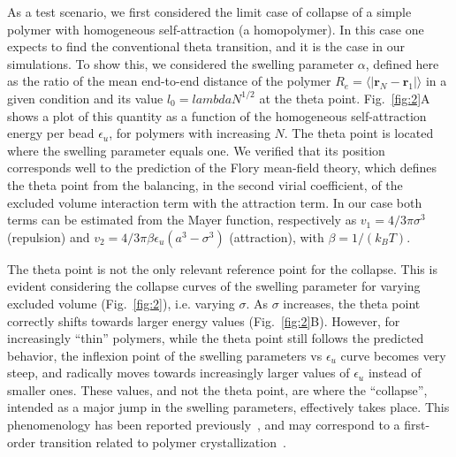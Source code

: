 \documentclass[a4paper,12pt,pre,superscriptaddress]{revtex4}
\begin{document}
As a test scenario, we first considered the limit case of collapse of
a simple polymer with homogeneous self-attraction (a homopolymer). In
this case one expects to find the conventional theta transition, and it
is the case in our simulations. To show this, we considered the
swelling parameter $\alpha$, defined here as the ratio of the mean
end-to-end distance of the polymer $R_e=\langle |\mathbf{r}_N -
\mathbf{r}_1| \rangle$ in a given condition and its value $l_0=
lambda N^{1/2}$
at the theta point.  Fig.~\ref{fig:2}A shows a plot of this quantity
as a function of the homogeneous self-attraction energy per bead
$\epsilon_u$, for polymers with increasing $N$. The theta point is
located where the swelling parameter equals one.  We verified that its
position corresponds well to the prediction of the Flory mean-field
theory, which defines the theta point from the balancing, in the
second virial coefficient, of the excluded volume interaction term
with the attraction term. In our case both terms can be estimated from
the Mayer function, respectively as $v_1 = 4/3 \pi \sigma^3$
(repulsion) and $v_2= 4/3 \pi \beta \epsilon_u (a^3 - \sigma^3)$
(attraction), with $\beta=1/(k_B T) $.


The theta point is not the only relevant reference point for the
collapse. This is evident considering the collapse curves of the
swelling parameter for varying excluded volume (Fig.~\ref{fig:2}),
i.e. varying $\sigma$.  As $\sigma$ increases, the theta point
correctly shifts towards larger energy values (Fig.~\ref{fig:2}B).
However, for increasingly ``thin'' polymers, while the theta point
still follows the predicted behavior, the inflexion point of the
swelling parameters vs $\epsilon_u$ curve becomes very steep, and
radically moves towards increasingly larger values of $\epsilon_u$
instead of smaller ones. These values, and not the theta point, are
where the ``collapse'', intended as a major jump in the swelling
parameters, effectively takes place.
This phenomenology has been reported previously~\cite{DeGennes1975},
and may correspond to a first-order transition related to polymer
crystallization~\cite{Taylor2009}.
\end{document}
